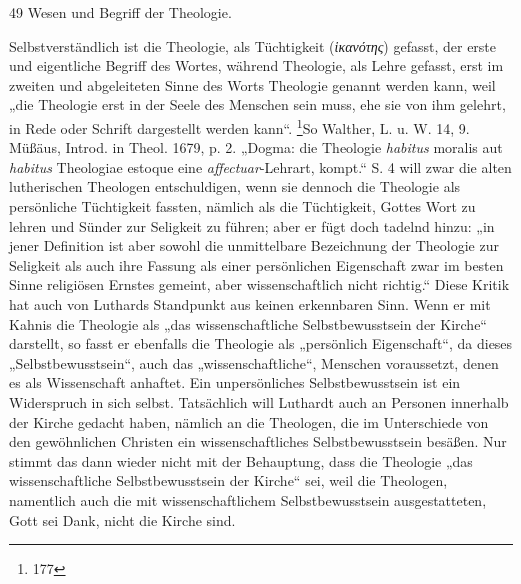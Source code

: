 \hfill 49 \hfill Wesen und Begriff der Theologie.

Selbstverständlich ist die Theologie, als Tüchtigkeit (\textit{ἱκανότης}) gefasst, der erste und eigentliche Begriff des Wortes, während Theologie, als Lehre gefasst, erst im zweiten und abgeleiteten Sinne des Worts Theologie genannt werden kann, weil „die Theologie erst in der Seele des Menschen sein muss, ehe sie von ihm gelehrt, in Rede oder Schrift dargestellt werden kann“.%
\footnote{177}{So Walther, L. u. W. 14, 9. Müßäus, Introd. in Theol. 1679, p. 2. „Dogma: die Theologie \textit{habitus} moralis aut \textit{habitus} Theologiae estoque eine \textit{affectuar}-Lehrart, kompt.“ S. 4 will zwar die alten lutherischen Theologen entschuldigen, wenn sie dennoch die Theologie als persönliche Tüchtigkeit fassten, nämlich als die Tüchtigkeit, Gottes Wort zu lehren und Sünder zur Seligkeit zu führen; aber er fügt doch tadelnd hinzu: „in jener Definition ist aber sowohl die unmittelbare Bezeichnung der Theologie zur Seligkeit als auch ihre Fassung als einer persönlichen Eigenschaft zwar im besten Sinne religiösen Ernstes gemeint, aber wissenschaftlich nicht richtig.“ Diese Kritik hat auch von Luthards Standpunkt aus keinen erkennbaren Sinn. Wenn er mit Kahnis die Theologie als „das wissenschaftliche Selbstbewusstsein der Kirche“ darstellt, so fasst er ebenfalls die Theologie als „persönlich Eigenschaft“, da dieses „Selbstbewusstsein“, auch das „wissenschaftliche“, Menschen voraussetzt, denen es als Wissenschaft anhaftet. Ein unpersönliches Selbstbewusstsein ist ein Widerspruch in sich selbst. Tatsächlich will Luthardt auch an Personen innerhalb der Kirche gedacht haben, nämlich an die Theologen, die im Unterschiede von den gewöhnlichen Christen ein wissenschaftliches Selbstbewusstsein besäßen. Nur stimmt das dann wieder nicht mit der Behauptung, dass die Theologie „das wissenschaftliche Selbstbewusstsein der Kirche“ sei, weil die Theologen, namentlich auch die mit wissenschaftlichem Selbstbewusstsein ausgestatteten, Gott sei Dank, nicht die Kirche sind.}

